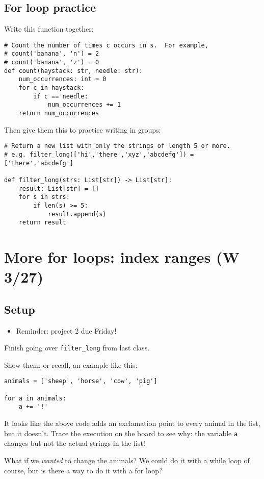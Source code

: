 \documentclass{article}
\newcommand{\ready}{\textcolor{Green}{\Checkmark}\xspace}
\begin{document}
\subsection*{For loop practice}

Write this function together:
\begin{verbatim}
# Count the number of times c occurs in s.  For example,
# count('banana', 'n') = 2
# count('banana', 'z') = 0
def count(haystack: str, needle: str):
    num_occurrences: int = 0
    for c in haystack:
        if c == needle:
            num_occurrences += 1
    return num_occurrences
\end{verbatim}

Then give them this to practice writing in groups:
\begin{verbatim}
# Return a new list with only the strings of length 5 or more.
# e.g. filter_long(['hi','there','xyz','abcdefg']) = ['there','abcdefg']

def filter_long(strs: List[str]) -> List[str]:
    result: List[str] = []
    for s in strs:
        if len(s) >= 5:
            result.append(s)
    return result
\end{verbatim}

\newpage
\section{\ready More for loops: index ranges (W 3/27)}

\subsection*{Setup}
\begin{itemize}
\item Reminder: project 2 due Friday!
\end{itemize}

Finish going over \verb|filter_long| from last class.

Show them, or recall, an example like this:
\begin{verbatim}
animals = ['sheep', 'horse', 'cow', 'pig']

for a in animals:
    a += '!'
\end{verbatim}

It looks like the above code adds an exclamation point to every animal
in the list, but it doesn't.  Trace the execution on the board to see
why: the variable \verb|a| changes but not the actual strings in the list!

What if we \emph{wanted} to change the animals?  We could do it with a
while loop of course, but is there a way to do it with a for loop?
\end{document}
